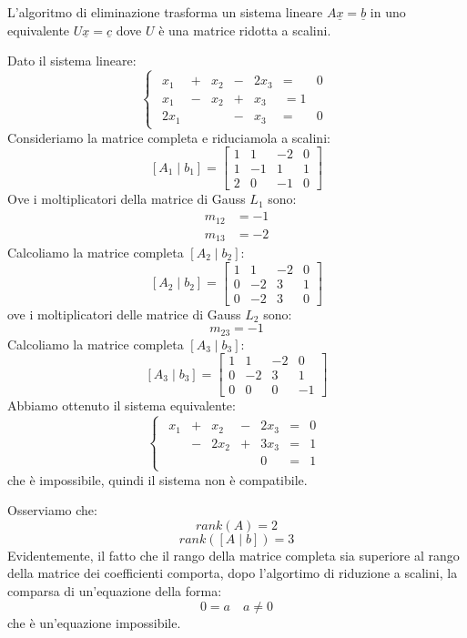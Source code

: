 \documentclass[12pt]{report}
\begin{document}
L'algoritmo di eliminazione trasforma un sistema lineare $A\underline{x} = \underline{b}$ in uno equivalente $U\underline{x} = \underline{c}$ dove $U$ è una matrice ridotta a scalini.
\begin{example}{}{}
Dato il sistema lineare:
\[
\begin{cases}
	\begin{array}{rcrcrcr}
	x_1 & + & x_2 & - & 2x_3 & = & 0 \\
	x_1 & - & x_2 & + & x_3 & = 1 \\
	2x_1 & & & - & x_3 & = & 0
	\end{array}
\end{cases}
\]
Consideriamo la matrice completa e riduciamola a scalini:
\[
[A_1 \mid b_1] = \left[
\begin{array}{rrr|c}
1 & 1 & -2 & 0 \\
1 & -1 & 1 & 1 \\
2 & 0 & -1 & 0
\end{array}
\right]
\]
Ove i moltiplicatori della matrice di Gauss $L_1$ sono:
\begin{align*}
m_{12} &= -1 \\
m_{13} &= -2
\end{align*}
Calcoliamo la matrice completa $[A_2 \mid b_2]$:
\[
[A_2 \mid b_2] = \left[
\begin{array}{rrr|c}
1 & 1 & -2 & 0 \\
0 & -2 & 3 & 1 \\
0 & -2 & 3 & 0
\end{array}
\right]
\]
ove i moltiplicatori delle matrice di Gauss $L_2$ sono:
\[
m_{23} = -1
\]
Calcoliamo la matrice completa $[A_3 \mid b_3]$:
\[
[A_3 \mid b_3] = \left[
\begin{array}{rrr|c}
1 & 1 & -2 & 0 \\
0 & -2 & 3 & 1 \\
0 & 0 & 0 & -1
\end{array}
\right]
\]
Abbiamo ottenuto il sistema equivalente:
\[
\begin{cases}
	\begin{array}{rcrcrcr}
	x_1 & + & x_2 & - & 2x_3 & = & 0 \\
	& - & 2x_2 & + & 3x_3 & = & 1 \\
	& & & & 0 & = & 1
	\end{array}
\end{cases}
\]
che è impossibile, quindi il sistema non è compatibile.

Osserviamo che:
\[
rank(A) = 2
\]
\[
rank([A \mid b]) = 3
\]
Evidentemente, il fatto che il rango della matrice completa sia superiore al rango della matrice dei coefficienti comporta, dopo l'algortimo di riduzione a scalini, la comparsa di un'equazione della forma:
\[
0 = a \quad a \neq 0
\]
che è un'equazione impossibile.
\end{example}
\end{document}
